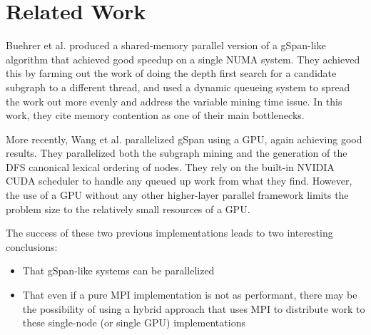 \section{Related Work}
\label{sec:related}

Buehrer et al. produced a shared-memory
parallel version of a gSpan-like algorithm that achieved good speedup on a 
single NUMA system\cite{buehrer2005parallel}.  They achieved this by 
farming out the work of doing the depth first search for a candidate 
subgraph to a different thread, and used a dynamic queueing 
system to spread the work out more evenly and address the variable
mining time issue.  In this work, they cite 
memory contention as one of their main bottlenecks.

More recently, Wang et al. parallelized gSpan using a 
GPU\cite{gspancuda}, again achieving good results.  They parallelized both
the subgraph mining and the generation of the DFS canonical lexical 
ordering of nodes.  They rely on the built-in NVIDIA CUDA scheduler to handle
any queued up work from what they find. However, the use of a 
GPU without any other higher-layer parallel framework limits the problem
size to the relatively small resources of a GPU. 

The success of these two previous implementations leads to two interesting
conclusions:
\begin{itemize}
	\item{That gSpan-like systems can be parallelized}
	\item{That even if a pure MPI implementation is not as performant, 
		there may be the possibility of using a hybrid approach
		that uses MPI to distribute work to these single-node 
		(or single GPU) implementations}
\end{itemize}